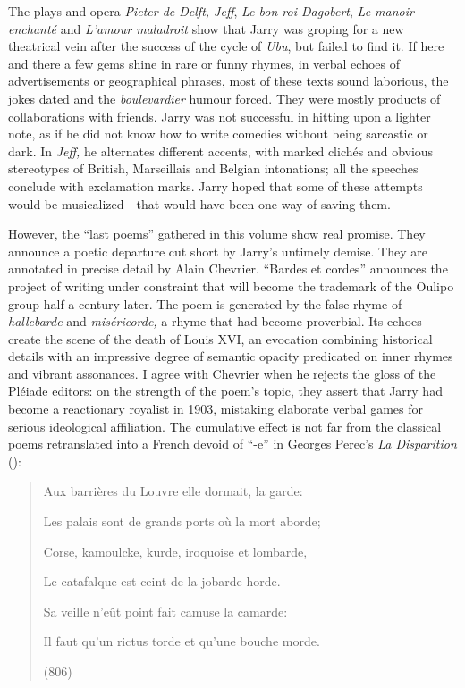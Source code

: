 \documentclass{article}
\begin{document}
The plays and opera \emph{Pieter de Delft, Jeff}, \emph{Le bon roi
Dagobert}, \emph{Le manoir enchanté} and \emph{L'amour maladroit} show
that Jarry was groping for a new theatrical vein after the success of
the cycle of \emph{Ubu}, but failed to find it. If here and there a few
gems shine in rare or funny rhymes, in verbal echoes of advertisements
or geographical phrases, most of these texts sound laborious, the jokes
dated and the \emph{boulevardier} humour forced. They were mostly
products of collaborations with friends. Jarry was not successful in
hitting upon a lighter note, as if he did not know how to write comedies
without being sarcastic or dark. In \emph{Jeff,} he alternates different
accents, with marked clichés and obvious stereotypes of British,
Marseillais and Belgian intonations; all the speeches conclude with
exclamation marks. Jarry hoped that some of these attempts would be
musicalized---that would have been one way of saving them.

However, the ``last poems'' gathered in this volume show real promise.
They announce a poetic departure cut short by Jarry's untimely demise.
They are annotated in precise detail by Alain Chevrier. ``Bardes et
cordes'' announces the project of writing under constraint that will
become the trademark of the Oulipo group half a century later. The poem
is generated by the false rhyme of \emph{hallebarde} and
\emph{miséricorde,} a rhyme that had become proverbial. Its echoes
create the scene of the death of Louis XVI, an evocation combining
historical details with an impressive degree of semantic opacity
predicated on inner rhymes and vibrant assonances. I agree with Chevrier
when he rejects the gloss of the Pléiade editors: on the strength of the
poem's topic, they assert that Jarry had become a reactionary royalist
in 1903, mistaking elaborate verbal games for serious ideological
affiliation. The cumulative effect is not far from the classical poems
retranslated into a French devoid of ``-e'' in Georges Perec's \emph{La
Disparition} (\citeyear{perec_disparition_1969}):

\begin{quote}
Aux barrières du Louvre elle dormait, la garde:

Les palais sont de grands ports où la mort aborde;

Corse, kamoulcke, kurde, iroquoise et lombarde,

Le catafalque est ceint de la jobarde horde.

Sa veille n'eût point fait camuse la camarde:

Il faut qu'un rictus torde et qu'une bouche morde.

\begin{flushright}
    (806)   
\end{flushright}
\end{quote}
\end{document}

